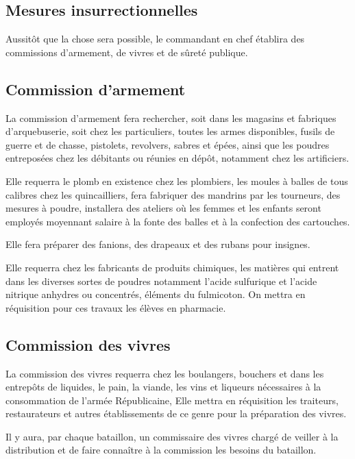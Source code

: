 \documentclass[french,twoside]{book} %
\begin{document}
\subsection[Mesures insurrectionnelles]{Mesures insurrectionnelles}
\noindent Aussitôt que la chose sera possible, le commandant en chef établira des commissions d’armement, de vivres et de sûreté publique.
\subsection[Commission d’armement]{Commission d’armement}
\noindent La commission d’armement fera rechercher, soit dans les magasins et fabriques d’arquebuserie, soit chez les particuliers, toutes les armes disponibles, fusils de guerre et de chasse, pistolets, revolvers, sabres et épées, ainsi que les poudres entreposées chez les débitants ou réunies en dépôt, notamment chez les artificiers.\par
Elle requerra le plomb en existence chez les plombiers, les moules à balles de tous calibres chez les quincailliers, fera fabriquer des mandrins par les tourneurs, des mesures à poudre, installera des ateliers où les femmes et les enfants seront employés moyennant salaire à la fonte des balles et à la confection des cartouches.\par
Elle fera préparer des fanions, des drapeaux et des rubans pour insignes.\par
Elle requerra chez les fabricants de produits chimiques, les matières qui entrent dans les diverses sortes de poudres notamment l’acide sulfurique et l’acide nitrique anhydres ou concentrés, éléments du fulmicoton. On mettra en réquisition pour ces travaux les élèves en pharmacie.
\subsection[Commission des vivres]{Commission des vivres}
\noindent La commission des vivres requerra chez les boulangers, bouchers et dans les entrepôts de liquides, le pain, la viande, les vins et liqueurs nécessaires à la consommation de l’armée Républicaine, Elle mettra en réquisition les traiteurs, restaurateurs et autres établissements de ce genre pour la préparation des vivres.\par
Il y aura, par chaque bataillon, un commissaire des vivres chargé de veiller à la distribution et de faire connaître à la commission les besoins du bataillon.
\end{document}
